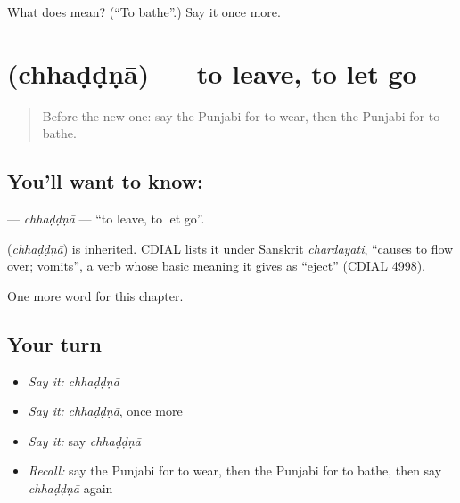\begin{tcolorbox}[breakable,colback=teal!4,colframe=teal!35!black,title={Before you move on}]
What does  mean? (\textquotedblleft{}To bathe\textquotedblright{}.) Say it once more.
\end{tcolorbox}
\section[\texorpdfstring{\pa{ਛੱਡਣਾ} (chhaḍḍṇā)}{ਛੱਡਣਾ (chhaḍḍṇā)}]{ (chhaḍḍṇā) — to leave, to let go}

\label{lesson:PA-C62-chhaddna}



\begin{quote}
Before the new one: say the Punjabi for to wear, then the Punjabi for to bathe.
\end{quote}

\subsection*{You'll want to know: }
\textbf{} — \emph{chhaḍḍṇā} — \textquotedblleft{}to leave, to let go\textquotedblright{}.

\begin{cousinweb}
\textbf{} (\emph{chhaḍḍṇā}) is inherited. CDIAL lists it under Sanskrit \emph{chardayati}, \textquotedblleft{}causes to flow over; vomits\textquotedblright{}, a verb whose basic meaning it gives as \textquotedblleft{}eject\textquotedblright{} (CDIAL 4998).
\end{cousinweb}

\begin{grammarlens}[title={What you've built}]
One more word for this chapter.
\end{grammarlens}

\subsection*{Your turn}
\begin{itemize}
\raggedright
  \item \emph{Say it:} \emph{chhaḍḍṇā}
  \item \emph{Say it:} \emph{chhaḍḍṇā}, once more
  \item \emph{Say it:} say \emph{chhaḍḍṇā}
  \item \emph{Recall:} say the Punjabi for to wear, then the Punjabi for to bathe, then say \emph{chhaḍḍṇā} again
\end{itemize}

